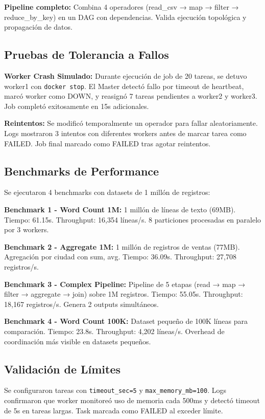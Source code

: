 \documentclass[conference]{IEEEtran}
\begin{document}
\textbf{Pipeline completo:} Combina 4 operadores (read\_csv → map → filter → reduce\_by\_key) en un DAG con dependencias. Valida ejecución topológica y propagación de datos.

\subsection{Pruebas de Tolerancia a Fallos}

\textbf{Worker Crash Simulado:} Durante ejecución de job de 20 tareas, se detuvo worker1 con \texttt{docker stop}. El Master detectó fallo por timeout de heartbeat, marcó worker como DOWN, y reasignó 7 tareas pendientes a worker2 y worker3. Job completó exitosamente en 15s adicionales.

\textbf{Reintentos:} Se modificó temporalmente un operador para fallar aleatoriamente. Logs mostraron 3 intentos con diferentes workers antes de marcar tarea como FAILED. Job final marcado como FAILED tras agotar reintentos.

\subsection{Benchmarks de Performance}

Se ejecutaron 4 benchmarks con datasets de 1 millón de registros:

\textbf{Benchmark 1 - Word Count 1M:} 1 millón de líneas de texto (69MB). Tiempo: 61.15s. Throughput: 16,354 líneas/s. 8 particiones procesadas en paralelo por 3 workers.

\textbf{Benchmark 2 - Aggregate 1M:} 1 millón de registros de ventas (77MB). Agregación por ciudad con sum, avg. Tiempo: 36.09s. Throughput: 27,708 registros/s.

\textbf{Benchmark 3 - Complex Pipeline:} Pipeline de 5 etapas (read → map → filter → aggregate → join) sobre 1M registros. Tiempo: 55.05s. Throughput: 18,167 registros/s. Genera 2 outputs simultáneos.

\textbf{Benchmark 4 - Word Count 100K:} Dataset pequeño de 100K líneas para comparación. Tiempo: 23.8s. Throughput: 4,202 líneas/s. Overhead de coordinación más visible en datasets pequeños.

\subsection{Validación de Límites}

Se configuraron tareas con \texttt{timeout\_sec=5} y \texttt{max\_memory\_mb=100}. Logs confirmaron que worker monitoreó uso de memoria cada 500ms y detectó timeout de 5s en tareas largas. Task marcada como FAILED al exceder límite.
\end{document}
